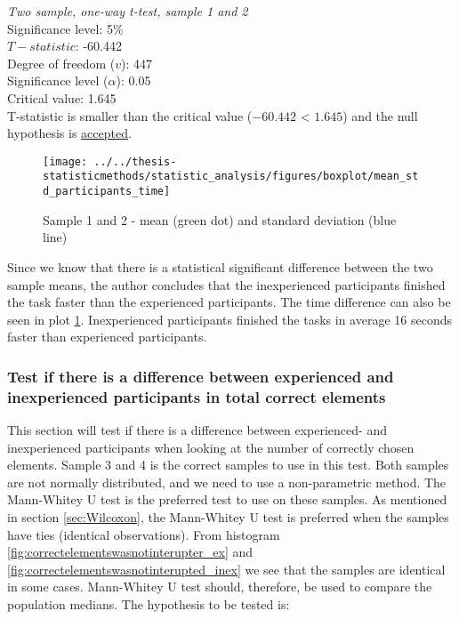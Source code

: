  \begin{center}
	\begin{tcolorbox}[width=0.8\textwidth]
		\centering
		\textit{Two sample, one-way t-test, sample 1 and 2}\\
		Significance level: 5\%  \\[0.5cm]
		
		$T-statistic$: -60.442 \\
		Degree of freedom ($v$): 447 \\ %
		Significance level ($\alpha$): 0.05 \\
		Critical value: 1.645\\[0.2cm]
		
		T-statistic is smaller than the critical value ($-60.442$ < $1.645$) and the null hypothesis is \underline{accepted}.\\[0.5cm]
	\end{tcolorbox} 
\end{center}

\begin{figure}[H]
	\centering
	\texttt{[image: ../../thesis-statisticmethods/statistic\_analysis/figures/boxplot/mean\_std\_participants\_time]}
	\caption{Sample 1 and 2 - mean (green dot) and standard deviation (blue line)}
	\label{fig:meanstdparticipantstime}
\end{figure}

Since we know that there is a statistical significant difference between the two sample means, the author concludes that the inexperienced participants finished the task faster than the experienced participants. The time difference can also be seen in plot \ref{fig:meanstdparticipantstime}. Inexperienced participants finished the tasks in average 16 seconds faster than experienced participants.\newline

\subsubsection[Sample 3, 4]{Test if there is a difference between experienced and inexperienced participants in total correct elements} %

This section will test if there is a difference between experienced- and inexperienced participants when looking at the number of correctly chosen elements. Sample 3 and 4 is the correct samples to use in this test. Both samples are not normally distributed, and we need to use a non-parametric method. The Mann-Whitey U test is the preferred test to use on these samples. As mentioned in section \ref{sec:Wilcoxon}, the Mann-Whitey U test is preferred when the samples have ties (identical observations). From histogram \ref{fig:correctelementswasnotinterupter_ex} and \ref{fig:correctelementswasnotinterupted_inex} we see that the samples are identical in some cases. Mann-Whitey U test should, therefore, be used to compare the population medians. The hypothesis to be tested is:\\[0.3cm]

